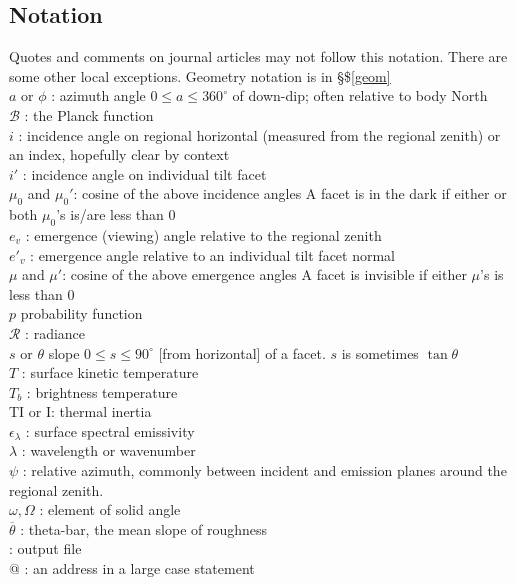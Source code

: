 \documentclass{article}
\begin{document}
\subsection{Notation  }
Quotes and comments on journal articles may not follow this notation. There are some other local exceptions.
Geometry notation is in \S \$\ref{geom}
\\ $a$ or $\phi$ : azimuth angle  $0 \leq a \leq 360^\circ $ of down-dip; often relative to body North
\\ $\mathcal{B}$ :  the Planck function
\\ $i$ : incidence angle on regional horizontal (measured from the regional zenith)
\qii  or an index, hopefully clear by context
\\ $i'$ : incidence angle on individual tilt facet
\\ $\mu_0$ and $\mu_0'$: cosine of the above incidence angles
\qi  A facet is in the dark if either or both $\mu_0$'s is/are less than 0
\\ $e_v$ : emergence (viewing) angle relative to the regional zenith
\\ $e'_v$ :  emergence angle relative to an individual tilt facet normal
\\ $\mu$ and $\mu'$: cosine of the above emergence angles
\qi  A facet is invisible if either $\mu$'s is less than 0 
\\ $p$ probability function
\\ $\mathcal{R}$ : radiance
\\ $s$ or $\theta$ slope  $0 \leq s \leq 90^\circ $ [from horizontal] of a facet. $s$ is sometimes $\tan \theta$
\\ $T$ : surface kinetic temperature
\\ $T_b$ : brightness temperature
\\ TI or I: thermal inertia
\\ $\epsilon_\lambda$ : surface spectral emissivity 
\\ $\lambda$ :  wavelength or wavenumber
\\ $\psi$ : relative azimuth, commonly between incident and emission planes around the regional zenith.
\\ $\omega, \Omega$ : element of solid angle
\\ $\overline{\theta}$ : theta-bar, the mean slope of roughness
\\ \qfo{---} : output file
\\ @ : an address in a large case statement
\end{document}
